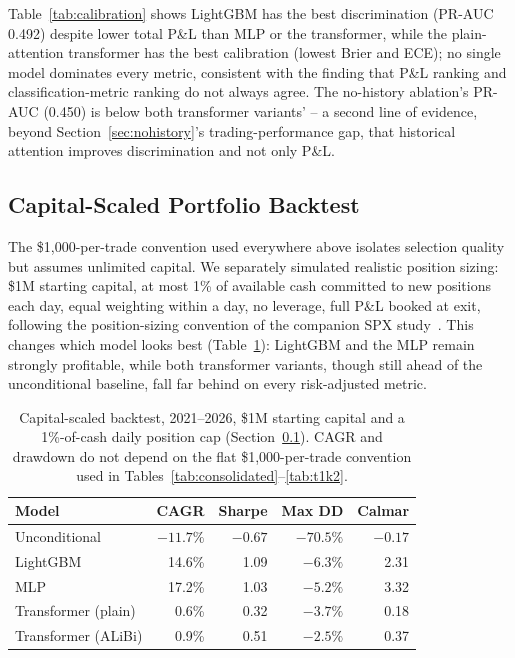 \documentclass[sigconf,review]{acmart}
\begin{document}
Table~\ref{tab:calibration} shows LightGBM has the best discrimination (PR-AUC 0.492) despite lower total P\&L than MLP or the transformer, while the plain-attention transformer has the best calibration (lowest Brier and ECE); no single model dominates every metric, consistent with the finding that P\&L ranking and classification-metric ranking do not always agree. The no-history ablation's PR-AUC (0.450) is below both transformer variants' -- a second line of evidence, beyond Section~\ref{sec:nohistory}'s trading-performance gap, that historical attention improves discrimination and not only P\&L.

\subsection{Capital-Scaled Portfolio Backtest}
\label{sec:capitalscaled}
The \$1,000-per-trade convention used everywhere above isolates selection quality but assumes unlimited capital. We separately simulated realistic position sizing: \$1M starting capital, at most 1\% of available cash committed to new positions each day, equal weighting within a day, no leverage, full P\&L booked at exit, following the position-sizing convention of the companion SPX study~\cite{glasserman2025tp2}. This changes which model looks best (Table~\ref{tab:capitalscaled}): LightGBM and the MLP remain strongly profitable, while both transformer variants, though still ahead of the unconditional baseline, fall far behind on every risk-adjusted metric.

\begin{table}[t]
\centering
\footnotesize
\begin{tabular}{lrrrr}
\toprule
Model & CAGR & Sharpe & Max DD & Calmar \\
\midrule
Unconditional & $-11.7\%$ & $-0.67$ & $-70.5\%$ & $-0.17$ \\
LightGBM & 14.6\% & 1.09 & $-6.3\%$ & 2.31 \\
MLP & 17.2\% & 1.03 & $-5.2\%$ & 3.32 \\
Transformer (plain) & 0.6\% & 0.32 & $-3.7\%$ & 0.18 \\
Transformer (ALiBi) & 0.9\% & 0.51 & $-2.5\%$ & 0.37 \\
\bottomrule
\end{tabular}
\caption{Capital-scaled backtest, 2021--2026, \$1M starting capital and a 1\%-of-cash daily position cap (Section~\ref{sec:capitalscaled}). CAGR and drawdown do not depend on the flat \$1,000-per-trade convention used in Tables~\ref{tab:consolidated}--\ref{tab:t1k2}.}
\label{tab:capitalscaled}
\end{table}
\end{document}
